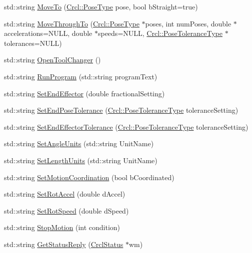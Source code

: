 \begin{DoxyCompactItemize}
std\-::string \hyperlink{classCrcl_1_1CrclClientCmdInterface_acf53a82b11af8bbaee332e3838e5e041}{Move\-To} (\hyperlink{namespaceCrcl_acc6c82b52280f4d0e74b82a92400956e}{Crcl\-::\-Pose\-Type} pose, bool b\-Straight=true)
\item 
std\-::string \hyperlink{classCrcl_1_1CrclClientCmdInterface_a619a4f09c1d8e339db0f693c61298fa9}{Move\-Through\-To} (\hyperlink{namespaceCrcl_acc6c82b52280f4d0e74b82a92400956e}{Crcl\-::\-Pose\-Type} $\ast$poses, int num\-Poses, double $\ast$accelerations=N\-U\-L\-L, double $\ast$speeds=N\-U\-L\-L, \hyperlink{namespaceCrcl_ac805071e16341b82d4fa4e12b7f3ac6f}{Crcl\-::\-Pose\-Tolerance\-Type} $\ast$tolerances=N\-U\-L\-L)
\item 
std\-::string \hyperlink{classCrcl_1_1CrclClientCmdInterface_a5d9b36d71b14cc1cf0609b9d7382271e}{Open\-Tool\-Changer} ()
\item 
std\-::string \hyperlink{classCrcl_1_1CrclClientCmdInterface_a638fd866f6952e1e04f98683d67d4e3b}{Run\-Program} (std\-::string program\-Text)
\item 
std\-::string \hyperlink{classCrcl_1_1CrclClientCmdInterface_a212ce9dc24e670cc16fa250b337bad22}{Set\-End\-Effector} (double fractional\-Setting)
\item 
std\-::string \hyperlink{classCrcl_1_1CrclClientCmdInterface_a2e8c1806096fd6baf49750d96747019b}{Set\-End\-Pose\-Tolerance} (\hyperlink{namespaceCrcl_ac805071e16341b82d4fa4e12b7f3ac6f}{Crcl\-::\-Pose\-Tolerance\-Type} tolerance\-Setting)
\item 
std\-::string \hyperlink{classCrcl_1_1CrclClientCmdInterface_a1eb5274689527c8d5cf63a3e0ac46e27}{Set\-End\-Effector\-Tolerance} (\hyperlink{namespaceCrcl_ac805071e16341b82d4fa4e12b7f3ac6f}{Crcl\-::\-Pose\-Tolerance\-Type} tolerance\-Setting)
\item 
std\-::string \hyperlink{classCrcl_1_1CrclClientCmdInterface_af71197c4718712a121635ce1329233cb}{Set\-Angle\-Units} (std\-::string Unit\-Name)
\item 
std\-::string \hyperlink{classCrcl_1_1CrclClientCmdInterface_ad842b61ccc69a4db16ee035103ede8bb}{Set\-Length\-Units} (std\-::string Unit\-Name)
\item 
std\-::string \hyperlink{classCrcl_1_1CrclClientCmdInterface_ab466d17abed84f28c653bca84882256a}{Set\-Motion\-Coordination} (bool b\-Coordinated)
\item 
std\-::string \hyperlink{classCrcl_1_1CrclClientCmdInterface_ab2424f0f8fc3ed068acd37b40e976b85}{Set\-Rot\-Accel} (double d\-Accel)
\item 
std\-::string \hyperlink{classCrcl_1_1CrclClientCmdInterface_a022300fe3a3870454d2a8fb761c2b1eb}{Set\-Rot\-Speed} (double d\-Speed)
\item 
std\-::string \hyperlink{classCrcl_1_1CrclClientCmdInterface_a6e2b895f50d889aa80870c02722ffcae}{Stop\-Motion} (int condition)
\item 
std\-::string \hyperlink{classCrcl_1_1CrclClientCmdInterface_af74231a5343156060c0ab6342e794a1f}{Get\-Status\-Reply} (\hyperlink{structCrcl_1_1CrclStatus}{Crcl\-Status} $\ast$wm)
\end{DoxyCompactItemize}


